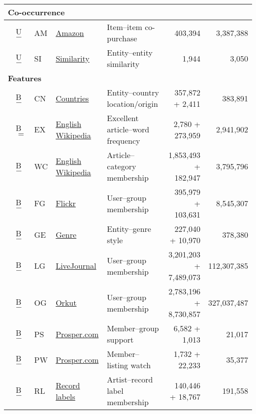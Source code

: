 \begin{longtable}{ l l l l l r r }
\hline
\multicolumn{7}{|l|}{\textbf{Co-occurrence}} \\
\hline
\cite{b556} & U$-$ & \textsf{AM} & \href{http://snap.stanford.edu/data/amazon0601.html}{Amazon} & Item--item co-purchase & 403,394 & 3,387,388 \\
\cite{b642} & U$-$ & \textsf{SI} & \href{http://wiki.dbpedia.org/Downloads}{Similarity} & Entity--entity similarity & 1,944 & 3,050 \\

\hline
\multicolumn{7}{|l|}{\textbf{Features}} \\
\hline
\cite{b642} & B$-$ & \textsf{CN} & \href{http://wiki.dbpedia.org/Downloads}{Countries} & Entity--country location/origin & 357,872 + 2,411 & 383,891 \\
\cite{download.wikimedia.org} & B$=$ & \textsf{EX} & \href{http://en.wikipedia.org/wiki/Wikipedia:Featured_articles}{English Wikipedia} & Excellent article--word frequency & 2,780 + 273,959 & 2,941,902 \\
\cite{download.wikimedia.org} & B$-$ & \textsf{WC} & \href{http://download.wikimedia.org/}{English Wikipedia} & Article--category membership & 1,853,493 + 182,947 & 3,795,796 \\
\cite{b560} & B$-$ & \textsf{FG} & \href{http://socialnetworks.mpi-sws.org/data-imc2007.html}{Flickr} & User--group membership & 395,979 + 103,631 & 8,545,307 \\
\cite{b642} & B$-$ & \textsf{GE} & \href{http://wiki.dbpedia.org/Downloads}{Genre} & Entity--genre style & 227,040 + 10,970 & 378,380 \\
\cite{b560} & B$-$ & \textsf{LG} & \href{http://socialnetworks.mpi-sws.org/data-imc2007.html}{LiveJournal} & User--group membership & 3,201,203 + 7,489,073 & 112,307,385 \\
\cite{b560} & B$-$ & \textsf{OG} & \href{http://socialnetworks.mpi-sws.org/data-imc2007.html}{Orkut} & User--group membership & 2,783,196 + 8,730,857 & 327,037,487 \\
\cite{prosper} & B$-$ & \textsf{PS} & \href{http://www.prosper.com/tools/DataExport.aspx}{Prosper.com} & Member--group support & 6,582 + 1,013 & 21,017 \\
\cite{prosper} & B$-$ & \textsf{PW} & \href{http://www.prosper.com/tools/DataExport.aspx}{Prosper.com} & Member--listing watch & 1,732 + 22,233 & 35,377 \\
\cite{b642} & B$-$ & \textsf{RL} & \href{http://wiki.dbpedia.org/Downloads}{Record labels} & Artist--record label membership & 140,446 + 18,767 & 191,558 \\

\end{longtable}
